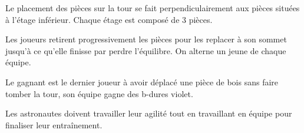 \documentclass{grand-jeu}
\begin{document}
\begin{liste-materiel}
\end{liste-materiel}

\begin{regles}
Le placement des pièces sur la tour se fait perpendiculairement aux pièces situées à l'étage inférieur. Chaque étage est composé de 3 pièces.

Les joueurs retirent progressivement les pièces pour les replacer à son sommet jusqu'à ce qu'elle finisse par perdre l'équilibre. On alterne un jeune de chaque équipe.

Le gagnant est le dernier joueur à avoir déplacé une pièce de bois sans faire tomber la tour, son équipe gagne des b-dures violet.
\end{regles}

\begin{imaginaire}
Les astronautes doivent travailler leur agilité tout en travaillant en équipe pour finaliser leur entraînement. 
\end{imaginaire}

\begin{moments-stop}
\end{moments-stop}
\end{document}

